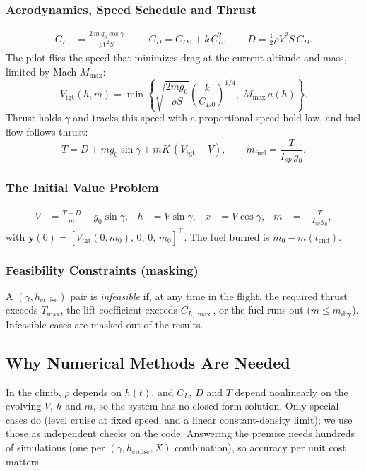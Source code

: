 \subsubsection{Aerodynamics, Speed Schedule and Thrust}
\begin{align}
  C_L &= \frac{2\,m\,g_0\cos\gamma}{\rho V^2 S}, \qquad
  C_D = C_{D0} + k\,C_L^2, \qquad
  D = \tfrac12\rho V^2 S\,C_D .
\end{align}
The pilot flies the speed that minimizes drag at the current altitude and mass, limited by Mach $M_{\max}$:
\begin{equation}
  V_{\text{tgt}}(h,m) = \min\!\left\{\sqrt{\frac{2mg_0}{\rho S}}\left(\frac{k}{C_{D0}}\right)^{1/4},\; M_{\max}\,a(h)\right\}.
\end{equation}
Thrust holds $\gamma$ and tracks this speed with a proportional speed-hold law, and fuel flow follows thrust:
\begin{equation}
  T = D + m g_0\sin\gamma + m K\,(V_{\text{tgt}} - V), \qquad \dot m_{\text{fuel}} = \frac{T}{I_{sp}\,g_0}.
\end{equation}

\subsubsection{The Initial Value Problem}
\begin{align}
  \dot V &= \frac{T-D}{m} - g_0\sin\gamma, &
  \dot h &= V\sin\gamma, &
  \dot x &= V\cos\gamma, &
  \dot m &= -\frac{T}{I_{sp}\,g_0},
\end{align}
with $\mathbf{y}(0)=[V_{\text{tgt}}(0,m_0),\,0,\,0,\,m_0]^\top$.
The fuel burned is $m_0 - m(t_{\text{end}})$.

\subsubsection{Feasibility Constraints (masking)}
A $(\gamma,h_{\text{cruise}})$ pair is \emph{infeasible} if, at any time in the flight, the required thrust exceeds $T_{\max}$,
the lift coefficient exceeds $C_{L,\max}$, or the fuel runs out ($m \le m_{\text{dry}}$). Infeasible cases are masked out of
the results.

\subsection{Why Numerical Methods Are Needed}
In the climb, $\rho$ depends on $h(t)$, and $C_L$, $D$ and $T$ depend nonlinearly on the evolving $V$, $h$ and $m$,
so the system has no closed-form solution. Only special cases do (level cruise at fixed speed, and a linear
constant-density limit); we use those as independent checks on the code. Answering the premise needs hundreds of simulations
(one per $(\gamma,h_{\text{cruise}},X)$ combination), so accuracy per unit cost matters.

